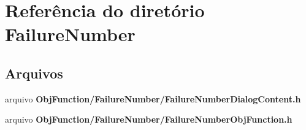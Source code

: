 \section{Referência do diretório Failure\+Number}
\label{dir_4a4e2cd7456ecdb461693d2ffe4843f8}
\subsection*{Arquivos}
\begin{DoxyCompactItemize}
\item 
arquivo {\bf Obj\+Function/\+Failure\+Number/\+Failure\+Number\+Dialog\+Content.\+h}
\item 
arquivo {\bf Obj\+Function/\+Failure\+Number/\+Failure\+Number\+Obj\+Function.\+h}
\end{DoxyCompactItemize}
